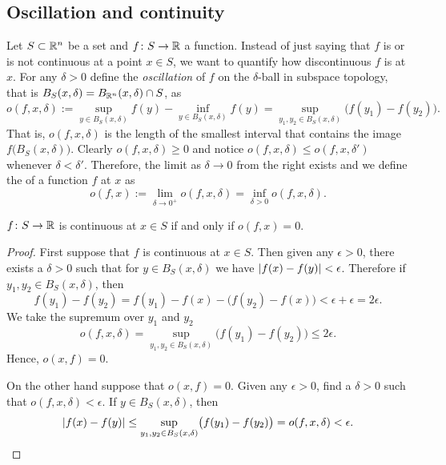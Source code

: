 \subsection{Oscillation and continuity}

Let $S \subset {\mathbb{R}}^n$ be a set and $f \colon S \to {\mathbb{R}}$ a function.
Instead of just saying that $f$ is or is not continuous at
a point $x \in S$,
we want to quantify how discontinuous $f$ is 
at $x$.  For any $\delta > 0$ define the \emph{oscillation} of 
$f$ on the $\delta$-ball in subspace topology, that is
$B_S(x,\delta) = B_{{\mathbb{R}}^n}(x,\delta) \cap S$, as
\begin{equation*}
o(f,x,\delta) :=
{\sup_{y \in B_S(x,\delta)} f(y)}
-
{\inf_{y \in B_S(x,\delta)} f(y)}
= 
\sup_{y_1,y_2 \in B_S(x,\delta)} \bigl(f(y_1)-f(y_2)\bigr) .
\end{equation*}
That is, $o(f,x,\delta)$ is the length of the smallest interval
that contains the image $f\bigl(B_S(x,\delta)\bigr)$.
Clearly $o(f,x,\delta) \geq 0$ and
notice $o(f,x,\delta) \leq o(f,x,\delta')$ whenever $\delta < \delta'$.
Therefore, the limit as $\delta \to 0$ from the right exists and
we define the \emph{} of a function $f$
at $x$ as
\begin{equation*}
o(f,x) :=
\lim_{\delta \to 0^+}
o(f,x,\delta) =
\inf_{\delta > 0}
o(f,x,\delta) .
\end{equation*}

\begin{prop}
$f \colon S \to {\mathbb{R}}$ is continuous at $x \in S$ if and only if $o(f,x) = 0$.
\end{prop}

\begin{proof}
First suppose that $f$ is continuous at $x \in S$.  Then given any $\epsilon > 0$,
there exists a $\delta > 0$ such that for $y \in B_S(x,\delta)$
we have $\lvert {f(x)-f(y)} \rvert < \epsilon$.  Therefore if $y_1,y_2 \in
B_S(x,\delta)$, then
\begin{equation*}
f(y_1)-f(y_2) =
f(y_1)-f(x)-\bigl(f(y_2)-f(x)\bigr) < \epsilon + \epsilon = 2 \epsilon .
\end{equation*}
We take the supremum over $y_1$ and $y_2$
\begin{equation*}
o(f,x,\delta) = 
\sup_{y_1,y_2 \in B_S(x,\delta)} \bigl(f(y_1)-f(y_2)\bigr)
\leq
2 \epsilon .
\end{equation*}
Hence, $o(x,f) = 0$.

On the other hand suppose that $o(x,f) = 0$.  Given any $\epsilon > 0$,
find a $\delta > 0$ such that $o(f,x,\delta) < \epsilon$.  If
$y \in B_S(x,\delta)$, then
\begin{equation*}
\lvert {f(x)-f(y)} \rvert
\leq
\sup_{y_1,y_2 \in B_S(x,\delta)} \bigl(f(y_1)-f(y_2)\bigr)
=
o(f,x,\delta) < \epsilon. \qedhere
\end{equation*}
\end{proof}

